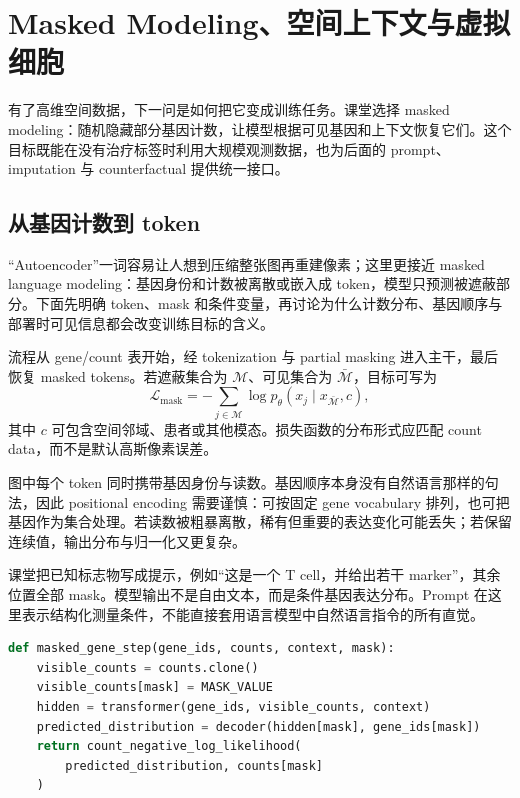 \section{Masked Modeling、空间上下文与虚拟细胞}

有了高维空间数据，下一问是如何把它变成训练任务。课堂选择 masked modeling：随机隐藏部分基因计数，让模型根据可见基因和上下文恢复它们。这个目标既能在没有治疗标签时利用大规模观测数据，也为后面的 prompt、imputation 与 counterfactual 提供统一接口。

\subsection{从基因计数到 token}

“Autoencoder”一词容易让人想到压缩整张图再重建像素；这里更接近 masked language modeling：基因身份和计数被离散或嵌入成 token，模型只预测被遮蔽部分。下面先明确 token、mask 和条件变量，再讨论为什么计数分布、基因顺序与部署时可见信息都会改变训练目标的含义。


流程从 gene/count 表开始，经 tokenization 与 partial masking 进入主干，最后恢复 masked tokens。若遮蔽集合为 $\mathcal{M}$、可见集合为 $\bar{\mathcal{M}}$，目标可写为
\[
\mathcal{L}_{\mathrm{mask}}
=-\sum_{j\in\mathcal{M}}
\log p_\theta(x_j\mid x_{\bar{\mathcal{M}}},c),
\]
其中 $c$ 可包含空间邻域、患者或其他模态。损失函数的分布形式应匹配 count data，而不是默认高斯像素误差。


图中每个 token 同时携带基因身份与读数。基因顺序本身没有自然语言那样的句法，因此 positional encoding 需要谨慎：可按固定 gene vocabulary 排列，也可把基因作为集合处理。若读数被粗暴离散，稀有但重要的表达变化可能丢失；若保留连续值，输出分布与归一化又更复杂。


课堂把已知标志物写成提示，例如“这是一个 T cell，并给出若干 marker”，其余位置全部 mask。模型输出不是自由文本，而是条件基因表达分布。Prompt 在这里表示结构化测量条件，不能直接套用语言模型中自然语言指令的所有直觉。

\begin{lstlisting}[language=Python,caption={掩码基因建模：只在隐藏位置计算监督信号}]
def masked_gene_step(gene_ids, counts, context, mask):
    visible_counts = counts.clone()
    visible_counts[mask] = MASK_VALUE
    hidden = transformer(gene_ids, visible_counts, context)
    predicted_distribution = decoder(hidden[mask], gene_ids[mask])
    return count_negative_log_likelihood(
        predicted_distribution, counts[mask]
    )
\end{lstlisting}

